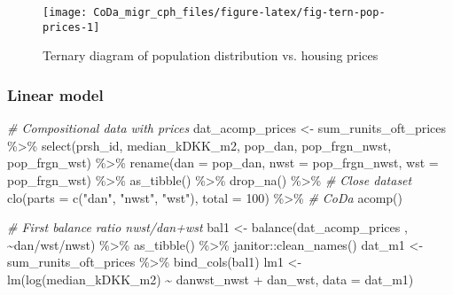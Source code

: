 \documentclass[
  12pt,
]{article}
\newenvironment{Shaded}{\begin{snugshade}}{\end{snugshade}}
\newcommand{\AttributeTok}[1]{\textcolor[rgb]{0.77,0.63,0.00}{#1}}
\newcommand{\CommentTok}[1]{\textcolor[rgb]{0.56,0.35,0.01}{\textit{#1}}}
\newcommand{\DecValTok}[1]{\textcolor[rgb]{0.00,0.00,0.81}{#1}}
\newcommand{\FunctionTok}[1]{\textcolor[rgb]{0.00,0.00,0.00}{#1}}
\newcommand{\NormalTok}[1]{#1}
\newcommand{\OtherTok}[1]{\textcolor[rgb]{0.56,0.35,0.01}{#1}}
\newcommand{\SpecialCharTok}[1]{\textcolor[rgb]{0.00,0.00,0.00}{#1}}
\newcommand{\StringTok}[1]{\textcolor[rgb]{0.31,0.60,0.02}{#1}}
\begin{document}
\begin{figure}[H]

{\centering \texttt{[image: CoDa\_migr\_cph\_files/figure-latex/fig-tern-pop-prices-1]} 

}

\caption{Ternary diagram of population distribution vs. housing prices}\label{fig:fig-tern-pop-prices}
\end{figure}

\hypertarget{linear-model}{%
\subsubsection{Linear model}\label{linear-model}}

\begin{Shaded}
\begin{Highlighting}[]
\CommentTok{\# Compositional data with prices }
\NormalTok{dat\_acomp\_prices }\OtherTok{\textless{}{-}}\NormalTok{ sum\_runits\_oft\_prices }\SpecialCharTok{\%\textgreater{}\%}
  \FunctionTok{select}\NormalTok{(prsh\_id, median\_kDKK\_m2, pop\_dan, pop\_frgn\_nwst, pop\_frgn\_wst) }\SpecialCharTok{\%\textgreater{}\%}
  \FunctionTok{rename}\NormalTok{(}\AttributeTok{dan =}\NormalTok{ pop\_dan, }
         \AttributeTok{nwst =}\NormalTok{ pop\_frgn\_nwst,}
         \AttributeTok{wst =}\NormalTok{ pop\_frgn\_wst) }\SpecialCharTok{\%\textgreater{}\%} 
  \FunctionTok{as\_tibble}\NormalTok{() }\SpecialCharTok{\%\textgreater{}\%}
  \FunctionTok{drop\_na}\NormalTok{() }\SpecialCharTok{\%\textgreater{}\%} 
  \CommentTok{\# Close dataset}
  \FunctionTok{clo}\NormalTok{(}\AttributeTok{parts =} \FunctionTok{c}\NormalTok{(}\StringTok{"dan"}\NormalTok{, }\StringTok{"nwst"}\NormalTok{, }\StringTok{"wst"}\NormalTok{),}
      \AttributeTok{total =} \DecValTok{100}\NormalTok{) }\SpecialCharTok{\%\textgreater{}\%} 
  \CommentTok{\# CoDa}
  \FunctionTok{acomp}\NormalTok{()}

\CommentTok{\# First balance ratio nwst/dan+wst}
\NormalTok{bal1   }\OtherTok{\textless{}{-}} \FunctionTok{balance}\NormalTok{(dat\_acomp\_prices , }\SpecialCharTok{\textasciitilde{}}\NormalTok{dan}\SpecialCharTok{/}\NormalTok{wst}\SpecialCharTok{/}\NormalTok{nwst) }\SpecialCharTok{\%\textgreater{}\%} \FunctionTok{as\_tibble}\NormalTok{() }\SpecialCharTok{\%\textgreater{}\%}\NormalTok{ janitor}\SpecialCharTok{::}\FunctionTok{clean\_names}\NormalTok{()}
\NormalTok{dat\_m1 }\OtherTok{\textless{}{-}}\NormalTok{ sum\_runits\_oft\_prices  }\SpecialCharTok{\%\textgreater{}\%} \FunctionTok{bind\_cols}\NormalTok{(bal1)}
\NormalTok{lm1    }\OtherTok{\textless{}{-}} \FunctionTok{lm}\NormalTok{(}\FunctionTok{log}\NormalTok{(median\_kDKK\_m2) }\SpecialCharTok{\textasciitilde{}}\NormalTok{ danwst\_nwst  }\SpecialCharTok{+}\NormalTok{ dan\_wst, }\AttributeTok{data =}\NormalTok{ dat\_m1)}


\end{Highlighting}
\end{Shaded}
\end{document}

